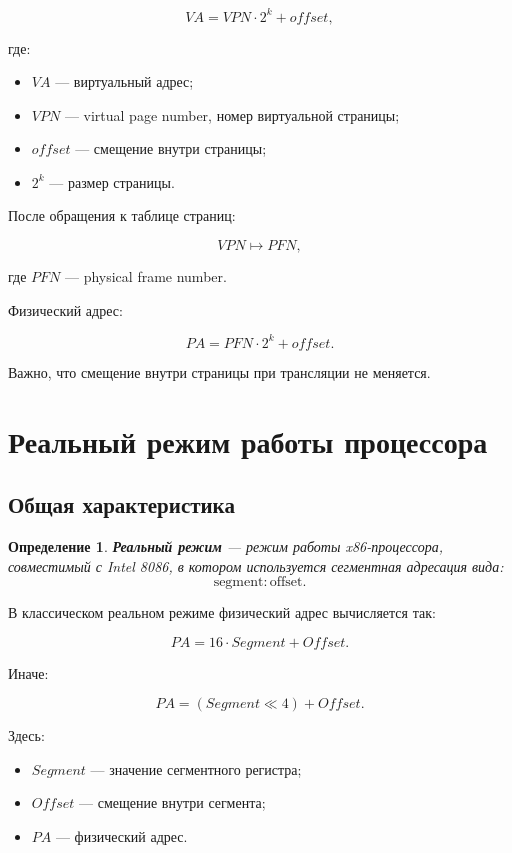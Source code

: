 \documentclass[a4paper,12pt]{article}
\newtheorem{definition}{Определение}
\begin{document}
\[
VA = VPN \cdot 2^k + offset,
\]

где:

\begin{itemize}
    \item $VA$ --- виртуальный адрес;
    \item $VPN$ --- virtual page number, номер виртуальной страницы;
    \item $offset$ --- смещение внутри страницы;
    \item $2^k$ --- размер страницы.
\end{itemize}

После обращения к таблице страниц:

\[
VPN \mapsto PFN,
\]

где $PFN$ --- physical frame number.

Физический адрес:

\[
PA = PFN \cdot 2^k + offset.
\]

Важно, что смещение внутри страницы при трансляции не меняется.

\section{Реальный режим работы процессора}

\subsection{Общая характеристика}

\begin{definition}
\textbf{Реальный режим} --- режим работы x86-процессора, совместимый с Intel 8086, в котором используется сегментная адресация вида:
\[
\text{segment} : \text{offset}.
\]
\end{definition}

В классическом реальном режиме физический адрес вычисляется так:

\[
PA = 16 \cdot Segment + Offset.
\]

Иначе:

\[
PA = (Segment \ll 4) + Offset.
\]

Здесь:

\begin{itemize}
    \item $Segment$ --- значение сегментного регистра;
    \item $Offset$ --- смещение внутри сегмента;
    \item $PA$ --- физический адрес.
\end{itemize}
\end{document}
